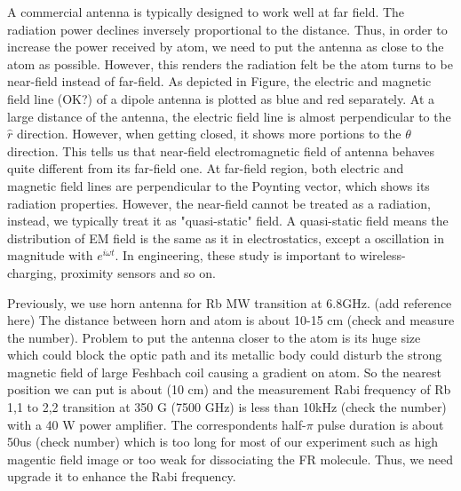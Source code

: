 A commercial antenna is typically designed to work well at far field. The radiation power declines inversely proportional to the distance. Thus, in order to increase the power received by atom, we need to put the antenna as close to the atom as possible. However, this renders the radiation felt be the atom turns to be near-field instead of far-field. As depicted in Figure, the electric and magnetic field line (OK?) of a dipole antenna is plotted as blue and red separately. At a large distance of the antenna, the electric field line is almost perpendicular to the \(\hat{r}\) direction. However, when getting closed, it shows more portions to the \(\theta\) direction. This tells us that near-field electromagnetic field of antenna behaves quite different from its far-field one. At far-field region, both electric and magnetic field lines are perpendicular to the Poynting vector, which shows its radiation properties. However, the near-field cannot be treated as a radiation, instead, we typically treat it as "quasi-static" field. A quasi-static field means the distribution of EM field is the same as it in electrostatics, except a oscillation in magnitude with \(e^{i\omega t}\). In engineering, these study is important to wireless-charging, proximity sensors and so on.

Previously, we use horn antenna for Rb MW transition at 6.8GHz. (add reference here) The distance between horn and atom is about 10-15 cm (check and measure the number). Problem to put the antenna closer to the atom is its huge size which could block the optic path and its metallic body could disturb the strong magnetic field of large Feshbach coil causing a gradient on atom. So the nearest position we can put is about (10 cm) and the measurement Rabi frequency of Rb 1,1 to 2,2 transition at 350 G (7500 GHz) is less than 10kHz (check the number) with a 40 W power amplifier. The correspondents half-\(\pi\) pulse duration is about 50us (check number) which is too long for most of our experiment such as high magentic field image or too weak for dissociating the FR molecule. Thus, we need upgrade it to enhance the Rabi frequency.

